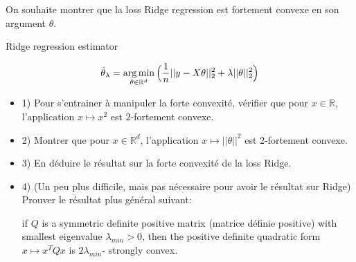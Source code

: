 \documentclass[
10pt, %
a4paper, %
oneside, %
headinclude,footinclude, %
BCOR5mm, %
]{scrartcl}
\begin{document}
On souhaite montrer que la loss Ridge regression est fortement convexe en son argument $\theta$.

\begin{definition}{Ridge regression estimator}

\begin{equation}
    \label{risk:ridge}
    \hat{ \theta}_{\lambda} = \operatorname*{arg\,min}_{\theta \in \mathbb{R}^d} \Big( \frac{1}{n} ||y-X\theta||_2^2 + \lambda || \theta||_2^2 \Big)
\end{equation}
\end{definition}


        \begin{itemize}
            \item 1) Pour s'entrainer à manipuler la forte convexité, vérifier que pour $x\in \mathbb{R}$, l'application $x\mapsto x^2$ est $2$-fortement convexe.
            \item 2) Montrer que pour $x\in \mathbb{R}^d$, l'application $x\mapsto ||\theta||^2$ est $2$-fortement convexe.
            \item 3) En déduire le résultat sur la forte convexité de la loss Ridge.
            \item 4) (Un peu plus difficile, mais pas nécessaire pour avoir le résultat sur Ridge) Prouver le résultat plus général suivant:

     if $Q$ is a symmetric definite positive matrix (matrice définie positive) with smallest eigenvalue $\lambda_{min}>0$, then the positive definite quadratic form $x\mapsto x^TQx$ is $ 2\lambda_{min}$- strongly convex.
        \end{itemize}
\end{document}
